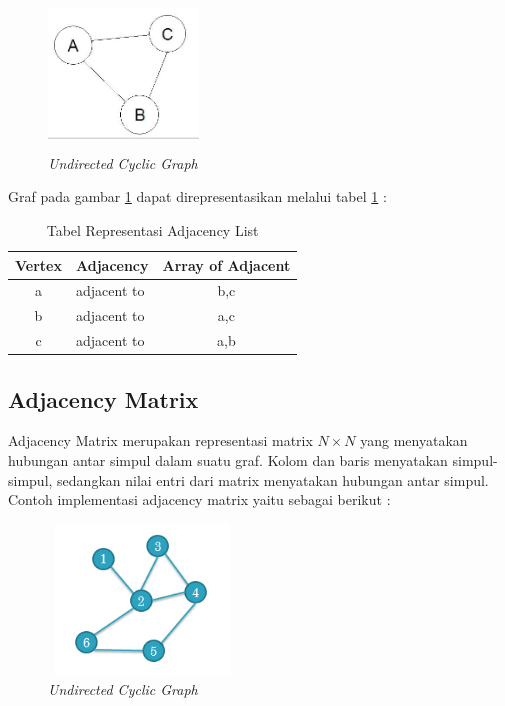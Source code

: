 \documentclass[a4paper,twoside]{article}
\begin{document}
\begin{enumerate}
 	\begin{figure} [H]
		\centering  
		\includegraphics[width=4cm, height=4cm]{adjacencylist} 
		\caption[\textit{Undirected Cyclic Graph}]{\textit{Undirected Cyclic Graph}}
		\label{fig:GambarAL} 
	\end{figure}
	
	Graf pada gambar \ref{fig:GambarAL} dapat direpresentasikan melalui tabel \ref{tabelAL} :
	
	
	\begin{table}[H]
\centering
\caption{Tabel Representasi Adjacency List}
\begin{tabular}{|c|p{2cm}|c|}
\hline
Vertex & Adjacency & Array of Adjacent\\
\hline
a & adjacent to & b,c \\
\hline
b & adjacent to & a,c \\
\hline
c & adjacent to & a,b\\
\hline
\end{tabular}
\label{tabelAL}
\end{table}

\subsection{Adjacency Matrix}
Adjacency Matrix merupakan representasi matrix $N \times N$ yang menyatakan hubungan antar simpul dalam suatu graf. Kolom dan baris menyatakan simpul-simpul, sedangkan nilai entri dari matrix menyatakan hubungan antar simpul. Contoh implementasi adjacency matrix yaitu sebagai berikut :

\begin{figure} [H]
		\centering  
		\includegraphics[width=5cm, height=4cm]{adjacencymatrix} 
		\caption[\textit{Undirected Cyclic Graph}]{\textit{Undirected Cyclic Graph}}
		\label{fig:GambarAM} 
	\end{figure}



\end{enumerate}
\end{document}
